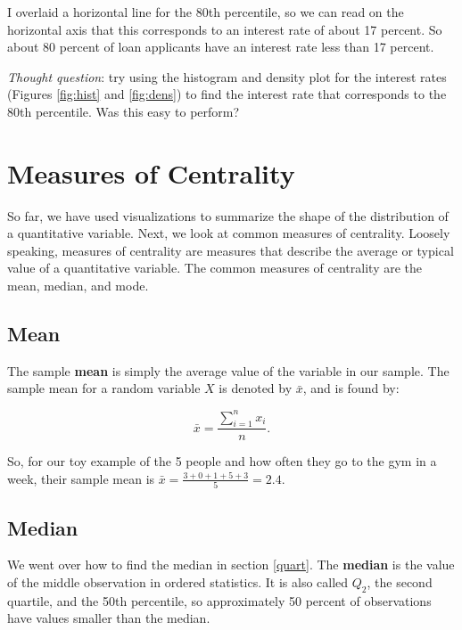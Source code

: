 \documentclass[
]{book}
\begin{document}
I overlaid a horizontal line for the 80th percentile, so we can read on the horizontal axis that this corresponds to an interest rate of about 17 percent. So about 80 percent of loan applicants have an interest rate less than 17 percent.

\emph{Thought question}: try using the histogram and density plot for the interest rates (Figures \ref{fig:hist} and \ref{fig:dens}) to find the interest rate that corresponds to the 80th percentile. Was this easy to perform?

\section{Measures of Centrality}\label{measures-of-centrality}

So far, we have used visualizations to summarize the shape of the distribution of a quantitative variable. Next, we look at common measures of centrality. Loosely speaking, measures of centrality are measures that describe the average or typical value of a quantitative variable. The common measures of centrality are the mean, median, and mode.

\subsection{Mean}\label{mean}

The sample \textbf{mean} is simply the average value of the variable in our sample. The sample mean for a random variable \(X\) is denoted by \(\bar{x}\), and is found by:

\begin{equation} 
\bar{x} = \frac{\sum_{i=1}^n x_i}{n}.
\label{eq:mean}
\end{equation}

So, for our toy example of the 5 people and how often they go to the gym in a week, their sample mean is \(\bar{x} = \frac{3+0+1+5+3}{5} = 2.4\).

\subsection{Median}\label{median}

We went over how to find the median in section \ref{quart}. The \textbf{median} is the value of the middle observation in ordered statistics. It is also called \(Q_2\), the second quartile, and the 50th percentile, so approximately 50 percent of observations have values smaller than the median.
\end{document}
